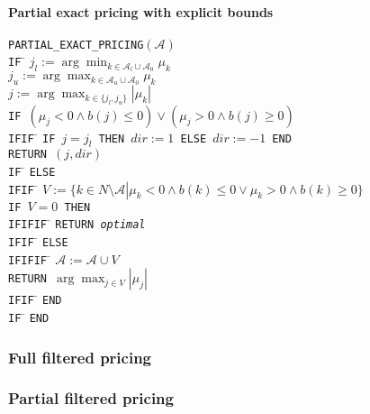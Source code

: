 \documentclass[a4paper]{article}
\begin{document}
\paragraph{Partial exact pricing with explicit bounds}
\begin{tabbing}
\texttt{PARTIAL\_EXACT\_PRICING$(\mathcal{A})$} \\
\texttt{IF} \= \kill
\> \texttt{$j_{l}:=\arg\min_{k \in \mathcal{A}_{l} \cup
                               \mathcal{A}_{0}}\mu_{k}$}  \\
\> \texttt{$j_{u}:=\arg\max_{k \in \mathcal{A}_{u} \cup
                               \mathcal{A}_{0}}\mu_{k}$}  \\
\> \texttt{$j:=\arg\max_{k \in \{j_{l}, j_{u}\}}\left|\mu_{k}\right|$}  \\
\> \texttt{IF $\left(\mu_{j} < 0 \wedge b\left(j\right) \leq 0 \right)
   \vee \left(\mu_{j} > 0 \wedge b\left(j\right) \geq 0 \right)$} \\
\texttt{IFIF} \= \kill
\> \texttt{IF $j=j_{l}$ THEN $dir:=1$ ELSE $dir:=-1$ END} \\
\> \texttt{RETURN $(j, dir)$} \\
\texttt{IF} \= \kill
\> \texttt{ELSE} \\
\texttt{IFIF} \= \kill
\> \texttt{$V:=\{k \in N \setminus \mathcal{A} \left|\right.
    \mu_{k} < 0 \wedge b\left(k\right) \leq 0 \vee
    \mu_{k} > 0 \wedge b\left(k\right) \geq 0\}$} \\
\> \texttt{IF $V=0$ THEN} \\
\texttt{IFIFIF} \= \kill  
\> \texttt{RETURN \emph{optimal}} \\
\texttt{IFIF} \= \kill
\> \texttt{ELSE} \\
\texttt{IFIFIF} \= \kill
\> \texttt{$\mathcal{A}:=\mathcal{A} \cup V$} \\
\> \texttt{RETURN $\arg\max_{j \in V}\left|\mu_{j}\right|$} \\
\texttt{IFIF} \= \kill
\> \texttt{END} \\
\texttt{IF} \= \kill
\> \texttt{END}
\end{tabbing}
\subsubsection{Full filtered pricing}
\subsubsection{Partial filtered pricing}
\end{document}
